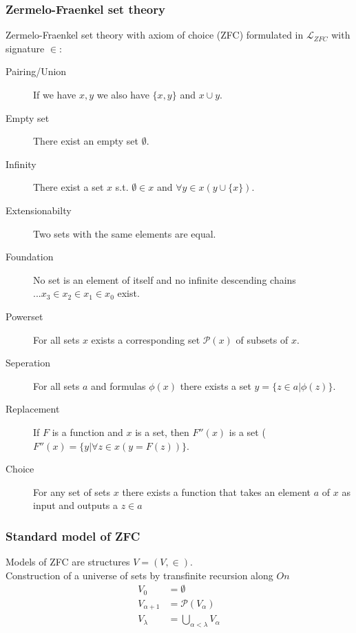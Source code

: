 \documentclass[10pt,danish]{beamer}
\begin{document}
\begin{frame}
 \frametitle{Zermelo-Fraenkel set theory}
Zermelo-Fraenkel set theory with axiom of choice (ZFC) formulated in $\mathcal{L}_{ZFC}$ with signature $\in$:
\begin{description}
 \item[Pairing/Union] If we have $x,y$ we also have $\{x,y\}$ and $x \cup y$.
 \item[Empty set] There exist an empty set $\emptyset$.
 \item[Infinity] There exist a set $x$ s.t. $\emptyset \in x$ and $\forall y \in x (y \cup \{ x \})$.
 \item[Extensionabilty] Two sets with the same elements are equal.
 \item[Foundation] No set is an element of itself and no infinite descending chains $...x_3 \in x_2 \in x_1 \in x_0$ exist.
 \item[Powerset] For all sets $x$ exists a corresponding set $\mathcal{P}(x)$ of subsets of $x$.
 \item[Seperation] For all sets $a$ and formulas $\phi (x)$ there exists a set $y = \{ z \in a | \phi(z) \}$.
 \item[Replacement] If $F$ is a function and $x$ is a set, then $F''(x)$ is a set ($F''(x) = \{ y | \forall z\in x (y=F(z))\}$.
 \item[Choice] For any set of sets $x$ there exists a function that takes an element $a$ of $x$ as input and outputs a $z \in a$
\end{description}
\end{frame}

\begin{frame}
 \frametitle{Standard model of ZFC}
Models of ZFC are structures $V = (V,\in)$.\\
Construction of a universe of sets by transfinite recursion along $On$
\begin{align*}
 V_0 &= \emptyset \\
 V_{\alpha + 1} &= \mathcal{P}(V_{\alpha})\\
 V_{\lambda} &= \bigcup_{\alpha < \lambda} V_{\alpha}
\end{align*}
\end{frame}
\end{document}
